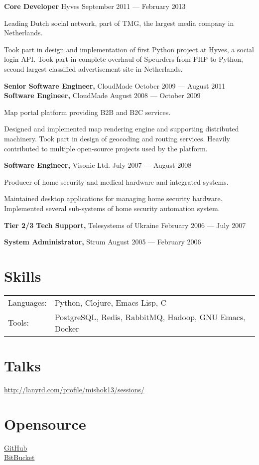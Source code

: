 \documentclass[margin]{res}
\begin{document}
\begin{resume}
{\bf Core Developer} Hyves \hfill September 2011 --- February 2013

Leading Dutch social network, part of TMG, the largest media company
in Netherlands.

Took part in design and implementation of first Python project at
Hyves, a social login API. Took part in complete overhaul of Speurders
from PHP to Python, second largest classified advertisement site in
Netherlands.

{\bf Senior Software Engineer,} CloudMade \hfill October 2009 --- August 2011\\
{\bf Software Engineer,} CloudMade \hfill August 2008 --- October 2009

Map portal platform providing B2B and B2C services.

Designed and implemented map rendering engine and supporting
distributed machinery. Took part in design of geocoding and routing
services. Heavily contributed to multiple open-source projects used by
the platform.

{\bf Software Engineer,} Visonic Ltd. \hfill July 2007 --- August 2008

Producer of home security and medical hardware and integrated systems.

Maintained desktop applications for managing home security
hardware. Implemented several sub-systems of home security automation
system.

{\bf Tier 2/3 Tech Support,} Telesystems of Ukraine \hfill February 2006 --- July 2007

{\bf System Administrator,} Strum \hfill August 2005 --- February 2006

\section{Skills}
\begin{tabular}{l p{5in}}
  Languages: & Python, Clojure, Emacs Lisp, C \\
  Tools: & PostgreSQL, Redis, RabbitMQ, Hadoop, GNU Emacs, Docker \\
\end{tabular}

\section{Talks}

\href{http://lanyrd.com/profile/mishok13/sessions/}{http://lanyrd.com/profile/mishok13/sessions/}

\section{Opensource}

\href{https://github.com/mishok13}{GitHub}\\
\href{https://bitbucket.org/mishok13}{BitBucket}

\end{resume}
\end{document}

